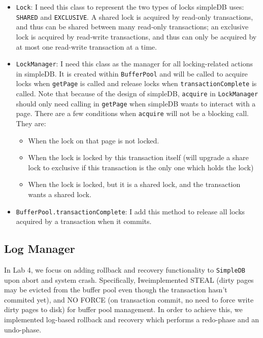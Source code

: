 \documentclass[12pt]{myland}
\def\<#1>{\texttt{#1}}
\begin{document}
	\begin{itemize}
        \item \texttt{Lock}: I need this class to represent the two types of locks simpleDB uses: \texttt{SHARED} and
            \texttt{EXCLUSIVE}. A shared lock is acquired by read-only transactions, and thus can be shared between
            many read-only transactions; an exclusive lock is acquired by read-write transactions, and thus can only be
            acquired by at most one read-write transaction at a time.
        \item \texttt{LockManager}: I need this class as the manager for all locking-related actions in simpleDB. It
            is created within \texttt{BufferPool} and will be called to acquire locks when \texttt{getPage} is called
            and release locks when \texttt{transactionComplete} is called. Note that because of the design of simpleDB,
            \texttt{acquire} in \texttt{LockManager} should only need calling in \texttt{getPage} when simpleDB wants to
            interact with a page. There are a few conditions when \texttt{acquire} will not be a blocking call. They are:
                \begin{itemize}
                    \item When the lock on that page is not locked.
                    \item When the lock is locked by this transaction itself (will upgrade a share lock to
                        exclusive if this transaction is the only one which holds the lock)
                    \item When the lock is locked, but it is a shared lock, and the transaction wants a shared lock.
                \end{itemize}
        \item \texttt{BufferPool.transactionComplete}: I add this method to release all locks acquired by a
            transaction when it commits.
	\end{itemize}

    \subsection{Log Manager}
    In Lab 4, we focus on adding rollback and recovery functionality to \<SimpleDB> upon abort and system crash.
    Specifically, Iweimplemented STEAL (dirty pages may be evicted from the buffer pool even though the transaction
    hasn't commited yet), and NO FORCE (on transaction commit, no need to force write dirty pages to disk) for buffer
    pool management. In order to achieve this, we implemented log-based rollback and recovery which performs a
    redo-phase and an undo-phase. \par
\end{document}
